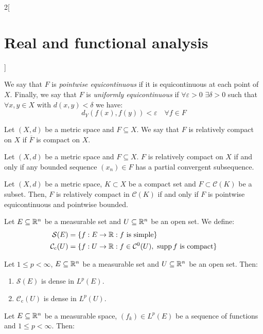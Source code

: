 \documentclass[../../../main_math.tex]{subfiles}
\begin{document}
\begin{multicols}{2}[\section{Real and functional analysis}]
\begin{definition}
    We say that $F$ is \emph{pointwise equicontinuous} if it is equicontinuous at each point of $X$. Finally, we say that $F$ is \emph{uniformly equicontinuous} if $\forall \varepsilon>0$ $\exists \delta>0$ such that $\forall x,y\in X$ with $d(x,y)<\delta$ we have: $$d_Y(f(x),f(y))<\varepsilon\quad\forall f\in F$$
  \end{definition}
  \begin{definition}
    Let $(X,d)$ be a metric space and $F\subseteq X$. We say that $F$ is relatively compact on $X$ if $\overline{F}$ is compact on $X$.
  \end{definition}
  \begin{lemma}
    Let $(X,d)$ be a metric space and $F\subseteq X$. $F$ is relatively compact on $X$ if and only if any bounded sequence $(x_n)\in F$ has a partial convergent subsequence.
  \end{lemma}
  \begin{theorem}
    Let $(X,d)$ be a metric space, $K\subset X$ be a compact set and $F\subset \mathcal{C}(K)$ be a subset. Then, $F$ is relatively compact in $\mathcal{C}(K)$ if and only if $F$ is pointwise equicontinuous and pointwise bounded.
  \end{theorem}
  \begin{definition}
    Let $E\subseteq\mathbb{R}^n$ be a measurable set and $U\subseteq \mathbb{R}^n$ be an open set. We define:
    \begin{align*}
      \mathcal{S}(E)              & =\{f:E\rightarrow\mathbb{R}:f\text{ is simple}\}                               \\
      \mathcal{C}_{\textrm{c}}(U) & =\{f:U\rightarrow\mathbb{R}:f\in\mathcal{C}^0(U),\ \operatorname{supp} f\text{ is compact}\}
    \end{align*}
  \end{definition}
  \begin{theorem}
    Let $1\leq p<\infty$, $E\subseteq\mathbb{R}^n$ be a measurable set and $U\subseteq \mathbb{R}^n$ be an open set. Then:
    \begin{enumerate}
      \item $\mathcal{S}(E)$ is dense in $L^p(E)$.
      \item $\mathcal{C}_{\textrm{c}}(U)$ is dense in $L^p(U)$.
    \end{enumerate}
  \end{theorem}
  \begin{theorem}
    Let $E\subseteq\mathbb{R}^n$ be a measurable space, $({f}_k)\in L^p(E)$ be a sequence of functions and $1\leq p<\infty$. Then:
    \begin{enumerate}

\end{enumerate}
\end{theorem}
\end{multicols}
\end{document}

